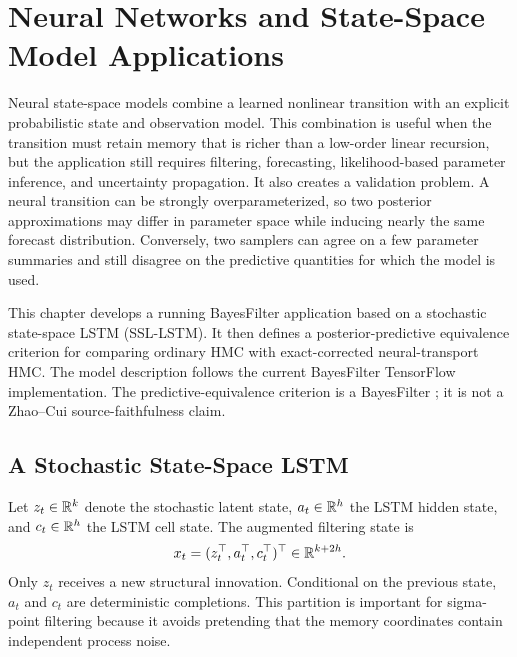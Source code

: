 \chapter[Neural State-Space Model Applications]
{Neural Networks and State-Space Model Applications}
\label{ch:bf-neural-network-ssm-applications}

Neural state-space models combine a learned nonlinear transition with an
explicit probabilistic state and observation model.  This combination is
useful when the transition must retain memory that is richer than a low-order
linear recursion, but the application still requires filtering, forecasting,
likelihood-based parameter inference, and uncertainty propagation.  It also
creates a validation problem.  A neural transition can be strongly
overparameterized, so two posterior approximations may differ in parameter
space while inducing nearly the same forecast distribution.  Conversely, two
samplers can agree on a few parameter summaries and still disagree on the
predictive quantities for which the model is used.

This chapter develops a running BayesFilter application based on a stochastic
state-space LSTM (SSL-LSTM).  It then defines a posterior-predictive
equivalence criterion for comparing ordinary HMC with exact-corrected
neural-transport HMC.  The model description follows the current BayesFilter
TensorFlow implementation.  The predictive-equivalence criterion is a
BayesFilter ; it is not a Zhao--Cui
source-faithfulness claim.

\section{A Stochastic State-Space LSTM}
\label{sec:bf-ssl-lstm-model}

Let $z_t\in\mathbb{R}^k$ denote the stochastic latent state, $a_t\in\mathbb{R}^h$ the LSTM
hidden state, and $c_t\in\mathbb{R}^h$ the LSTM cell state.  The augmented filtering
state is
\begin{equation}
  x_t = (z_t^\top,a_t^\top,c_t^\top)^\top
  \in \mathbb{R}^{k+2h}.
  \label{eq:bf-ssl-lstm-state}
\end{equation}
Only $z_t$ receives a new structural innovation.  Conditional on the previous
state, $a_t$ and $c_t$ are deterministic completions.  This partition is
important for sigma-point filtering because it avoids pretending that the
memory coordinates contain independent process noise.

